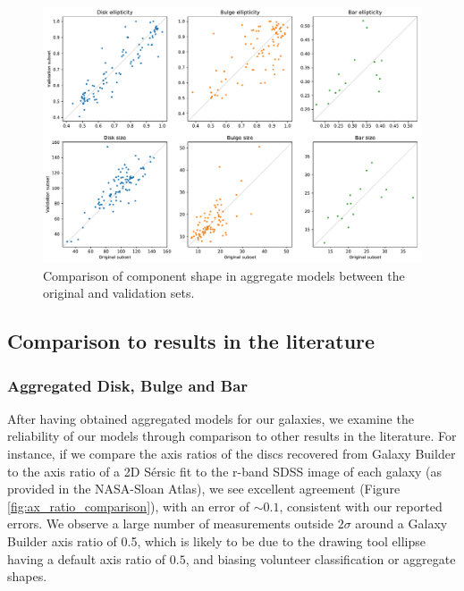 \documentclass[../main.tex]{subfiles}
\begin{document}
\begin{figure}
  \includegraphics[width=17.3cm]{images__results/component_sizing.pdf}
  \caption{Comparison of component shape in aggregate models between the original and validation sets.}
  \label{fig:aggregate_model_consistency}
\end{figure}


\subsection{Comparison to results in the literature}

\subsubsection{Aggregated Disk, Bulge and Bar}

After having obtained aggregated models for our galaxies, we examine the reliability of our models through comparison to other results in the literature. For instance, if we compare the axis ratios of the discs recovered from Galaxy Builder to the axis ratio of a 2D S\'ersic fit to the r-band SDSS image of each galaxy (as provided in the NASA-Sloan Atlas), we see excellent agreement (Figure \ref{fig:ax_ratio_comparison}), with an error of $\sim0.1$, consistent with our reported errors. We observe a large number of measurements outside $2\sigma$ around a Galaxy Builder axis ratio of 0.5, which is likely to be due to the drawing tool ellipse having a default axis ratio of $0.5$, and biasing volunteer classification or aggregate shapes.
\end{document}
